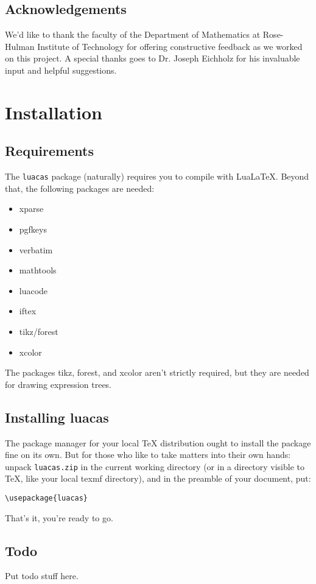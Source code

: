 \documentclass{article}
\begin{document}
\subsection{Acknowledgements}

We'd like to thank the faculty of the Department of Mathematics at Rose-Hulman Institute of Technology for offering constructive feedback as we worked on this project. A special thanks goes to Dr. Joseph Eichholz for his invaluable input and helpful suggestions. 

\section{Installation}

\subsection{Requirements}

The \texttt{luacas} package (naturally) requires you to compile with Lua\LaTeX{}. Beyond that, the following packages are needed:
\begin{multicols}{2}
{\ttfamily 
\begin{itemize}
    \item xparse
    \item pgfkeys
    \item verbatim
    \item mathtools
    \item luacode
    \item iftex
    \item tikz/forest
    \item xcolor
\end{itemize}}
\end{multicols}
The packages {\ttfamily tikz}, {\ttfamily forest}, and {\ttfamily xcolor} aren't strictly required, but they are needed for drawing expression trees.

\subsection{Installing {\ttfamily luacas}}
The package manager for your local TeX distribution ought to install the package fine on its own. But for those who like to take matters into their own hands: unpack \texttt{luacas.zip} in the current working directory (or in a directory visible to TeX, like your local texmf directory), and in the preamble of your document, put:
\begin{verbatim}
\usepackage{luacas}
\end{verbatim}
That's it, you're ready to go.

\subsection{Todo}

Put todo stuff here.
\end{document}
